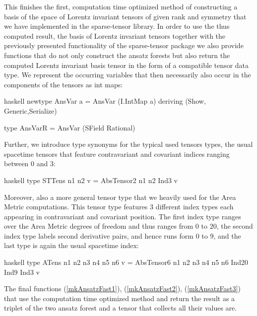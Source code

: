 \documentclass[a4paper,12pt, DIV=14, BCOR=5mm, twoside, headsepline, numbers=noenddot]{scrbook}
\begin{document}
This finishes the first, computation time optimized method of constructing a basis of the space of Lorentz invariant tensors of given rank and symmetry that we have implemented in the sparse-tensor library. In order to use the thus computed result, the basis of Lorentz invariant tensors together with the previously presented functionality of the sparse-tensor package we also provide functions that do not only construct the ansatz forests but also return the computed Lorentz invariant basis tensor in the form of a compatible tensor data type. We represent the occurring variables that then necessarily also occur in the components of the tensors as int maps:
\begin{center}
\begin{cminted}{haskell}
newtype AnsVar a = AnsVar (I.IntMap a) deriving (Show, Generic,Serialize)

type AnsVarR = AnsVar (SField Rational)
\end{cminted}
\end{center}

Further, we introduce type synonyms for the typical used tensors types, the usual spacetime tensors that feature contravariant and covariant indices ranging between $0$ and $3$:
\begin{center}
\begin{cminted}{haskell}
type STTens n1 n2 v = AbsTensor2 n1 n2 Ind3 v
\end{cminted}
\end{center}

Moreover, also a more general tensor type that we heavily used for the Area Metric computations. This tensor type features 3 different index types each appearing in contravariant and covariant position. The first index type ranges over the Area Metric degrees of freedom and thus ranges from $0$ to $20$, the second index type labels second derivative pairs, and hence runs form $0$ to $9$, and the last type is again the usual spacetime index:
\begin{center}
\begin{cminted}{haskell}
type ATens n1 n2 n3 n4 n5 n6 v = 
     AbsTensor6 n1 n2 n3 n4 n5 n6 Ind20 Ind9 Ind3 v
\end{cminted}
\end{center}

The final functions (\ref{mkAnsatzFast1}), (\ref{mkAnsatzFast2}), (\ref{mkAnsatzFast3}) that use the computation time optimized method and return the result as a triplet of the two ansatz forest and a tensor that collects all their values are.
\end{document}
